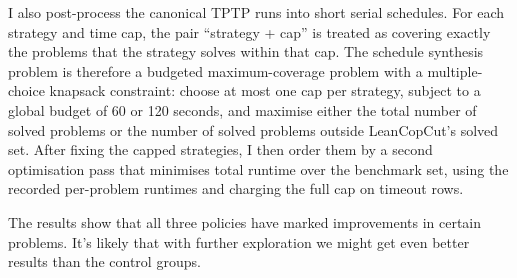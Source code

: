 \documentclass[11pt,twocolumn]{article}
\begin{document}
I also post-process the canonical TPTP runs into short serial schedules.
For each strategy and time cap, the pair ``strategy + cap'' is treated as covering exactly the problems that the strategy solves within that cap.
The schedule synthesis problem is therefore a budgeted maximum-coverage problem with a multiple-choice knapsack constraint: choose at most one cap per strategy, subject to a global budget of 60 or 120 seconds, and maximise either the total number of solved problems or the number of solved problems outside LeanCopCut's solved set.
After fixing the capped strategies, I then order them by a second optimisation pass that minimises total runtime over the benchmark set, using the recorded per-problem runtimes and charging the full cap on timeout rows.

The results show that all three policies have marked improvements in certain problems.
It's likely that with further exploration we might get even better results than the control groups.

\renewcommand*{\bibfont}{\small}
\printbibliography{}
\end{document}
